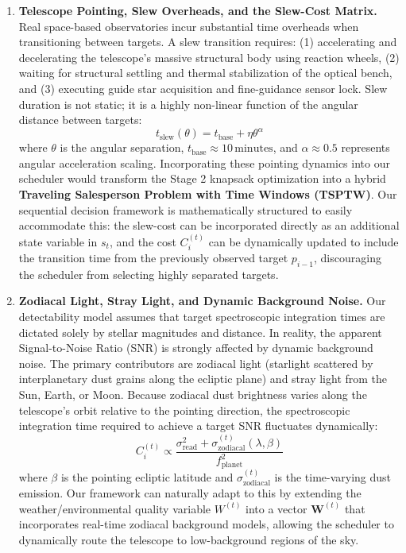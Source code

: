 \documentclass[11pt,a4paper]{article}
\begin{document}
\begin{enumerate}
    \item \textbf{Telescope Pointing, Slew Overheads, and the Slew-Cost Matrix.}
    Real space-based observatories incur substantial time overheads when transitioning between targets. A slew transition requires: (1) accelerating and decelerating the telescope's massive structural body using reaction wheels, (2) waiting for structural settling and thermal stabilization of the optical bench, and (3) executing guide star acquisition and fine-guidance sensor lock. Slew duration is not static; it is a highly non-linear function of the angular distance between targets:
    \begin{equation}
    t_{\text{slew}}(\theta) = t_{\text{base}} + \eta \theta^\alpha
    \label{eq:slew_time}
    \end{equation}
    where $\theta$ is the angular separation, $t_{\text{base}} \approx 10\,\text{minutes}$, and $\alpha \approx 0.5$ represents angular acceleration scaling. Incorporating these pointing dynamics into our scheduler would transform the Stage 2 knapsack optimization into a hybrid \textbf{Traveling Salesperson Problem with Time Windows (TSPTW)}. Our sequential decision framework is mathematically structured to easily accommodate this: the slew-cost can be incorporated directly as an additional state variable in $s_t$, and the cost $C_i^{(t)}$ can be dynamically updated to include the transition time from the previously observed target $p_{i-1}$, discouraging the scheduler from selecting highly separated targets.

    \item \textbf{Zodiacal Light, Stray Light, and Dynamic Background Noise.}
    Our detectability model assumes that target spectroscopic integration times are dictated solely by stellar magnitudes and distance. In reality, the apparent Signal-to-Noise Ratio (SNR) is strongly affected by dynamic background noise. The primary contributors are zodiacal light (starlight scattered by interplanetary dust grains along the ecliptic plane) and stray light from the Sun, Earth, or Moon. Because zodiacal dust brightness varies along the telescope's orbit relative to the pointing direction, the spectroscopic integration time required to achieve a target SNR fluctuates dynamically:
    \begin{equation}
    C_i^{(t)} \propto \frac{\sigma_{\text{read}}^2 + \sigma_{\text{zodiacal}}^{(t)}(\lambda, \beta)}{f_{\text{planet}}^2}
    \label{eq:dynamic_noise}
    \end{equation}
    where $\beta$ is the pointing ecliptic latitude and $\sigma_{\text{zodiacal}}^{(t)}$ is the time-varying dust emission. Our framework can naturally adapt to this by extending the weather/environmental quality variable $W^{(t)}$ into a vector $\mathbf{W}^{(t)}$ that incorporates real-time zodiacal background models, allowing the scheduler to dynamically route the telescope to low-background regions of the sky.


\end{enumerate}
\end{document}
